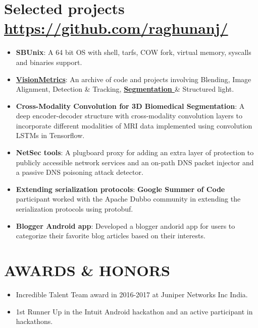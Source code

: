 \documentclass[letterpaper,11pt]{article}
\newcommand{\resumeItem}[2]{
  \item\small{
    \textbf{#1}{: #2 \vspace{-2pt}}
  }
}
\newcommand{\resumeSubItem}[2]{\resumeItem{#1}{#2}\vspace{-4pt}}
\newcommand{\resumeSubHeadingListStart}{\begin{itemize}[leftmargin=*]}
\newcommand{\resumeSubHeadingListEnd}{\end{itemize}}
\begin{document}
\section{Selected projects \hfill \textbf{\href{https://github.com/raghunanj/}{https://github.com/raghunanj/}}}
  \resumeSubHeadingListStart  
      \resumeSubItem{SBUnix}{A 64 bit OS with shell, tarfs, COW fork, virtual memory, syscalls and binaries support.  } 
      \resumeSubItem {\textbf {\href{https://github.com/raghunanj/ComputerVisionBasics}{VisionMetrics}}}{An archive of code and projects involving Blending, Image Alignment, Detection \& Tracking, \textbf{\href{https://www.youtube.com/watch?v=39CRobb2uGQ}{Segmentation }}\& Structured light.}
  \resumeSubItem{Cross-Modality Convolution for 3D Biomedical Segmentation}
      {A deep encoder-decoder structure with cross-modality convolution layers to incorporate different modalities of MRI data implemented using convolution LSTMs in Tensorflow.} 
      \resumeSubItem{NetSec tools}
      {A plugboard proxy for adding an extra layer of protection to publicly accessible network services and an on-path DNS packet injector and a passive DNS poisoning attack detector.}
      \resumeSubItem{Extending serialization protocols}{\textbf{Google Summer of Code } participant worked with the Apache Dubbo community in extending the serialization protocols using protobuf. }
      
   

       \resumeSubItem{Blogger Android app}
      {Developed a blogger andorid app for users to categorize their favorite blog articles based on their interests.}
     
   
      
     
  \resumeSubHeadingListEnd



\section{AWARDS \& HONORS}  
\begin{itemize}[noitemsep]

\item {Incredible Talent Team award in 2016-2017 at Juniper Networks Inc India.}
\item {1st Runner Up in the Intuit Android hackathon and an active participant in hackathons. }
\end{itemize}
  

\end{document}
